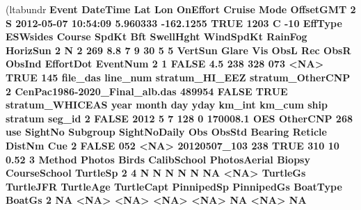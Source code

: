 \documentclass[
]{book}
\newenvironment{Shaded}{\begin{snugshade}}{\end{snugshade}}
\newcommand{\DecValTok}[1]{\textcolor[rgb]{0.00,0.00,0.81}{#1}}
\newcommand{\ErrorTok}[1]{\textcolor[rgb]{0.64,0.00,0.00}{\textbf{#1}}}
\newcommand{\FloatTok}[1]{\textcolor[rgb]{0.00,0.00,0.81}{#1}}
\newcommand{\KeywordTok}[1]{\textcolor[rgb]{0.13,0.29,0.53}{\textbf{#1}}}
\newcommand{\NormalTok}[1]{#1}
\newcommand{\OperatorTok}[1]{\textcolor[rgb]{0.81,0.36,0.00}{\textbf{#1}}}
\newcommand{\OtherTok}[1]{\textcolor[rgb]{0.56,0.35,0.01}{#1}}
\newcommand{\StringTok}[1]{\textcolor[rgb]{0.31,0.60,0.02}{#1}}
\begin{document}
\begin{Shaded}
\begin{Highlighting}[]
\NormalTok{(ltabundr }\OperatorTok{%
\NormalTok{  Event            DateTime      Lat       Lon OnEffort Cruise Mode OffsetGMT}
\DecValTok{2}\NormalTok{     S }\DecValTok{2012-05-07} \DecValTok{10}\OperatorTok{:}\DecValTok{54}\OperatorTok{:}\DecValTok{09} \FloatTok{5.960333} \FloatTok{-162.1255}     \OtherTok{TRUE}   \DecValTok{1203}\NormalTok{    C       }\DecValTok{-10}
\NormalTok{  EffType ESWsides Course SpdKt Bft SwellHght WindSpdKt RainFog HorizSun}
\DecValTok{2}\NormalTok{       N        }\DecValTok{2}    \DecValTok{269}   \FloatTok{8.8}   \DecValTok{7}         \DecValTok{9}        \DecValTok{30}       \DecValTok{5}        \DecValTok{5}
\NormalTok{  VertSun Glare Vis ObsL Rec ObsR ObsInd EffortDot EventNum}
\DecValTok{2}       \DecValTok{1} \OtherTok{FALSE} \FloatTok{4.5}  \DecValTok{238} \DecValTok{328}  \DecValTok{073}   \OperatorTok{<}\OtherTok{NA}\OperatorTok{>}\StringTok{      }\OtherTok{TRUE}      \DecValTok{145}
\NormalTok{                       file_das line_num stratum_HI_EEZ stratum_OtherCNP}
\DecValTok{2}\NormalTok{ CenPac1986}\DecValTok{-2020}\NormalTok{_Final_alb.das   }\DecValTok{489954}          \OtherTok{FALSE}             \OtherTok{TRUE}
\NormalTok{  stratum_WHICEAS year month day yday km_int   km_cum ship  stratum seg_id}
\DecValTok{2}           \OtherTok{FALSE} \DecValTok{2012}     \DecValTok{5}   \DecValTok{7}  \DecValTok{128}      \DecValTok{0} \FloatTok{170008.1}\NormalTok{  OES OtherCNP    }\DecValTok{268}
\NormalTok{    use SightNo Subgroup SightNoDaily Obs ObsStd Bearing Reticle DistNm Cue}
\DecValTok{2} \OtherTok{FALSE}     \DecValTok{052}     \OperatorTok{<}\OtherTok{NA}\OperatorTok{>}\StringTok{ }\DecValTok{20120507}\NormalTok{_}\DecValTok{103} \DecValTok{238}   \OtherTok{TRUE}     \DecValTok{310}      \DecValTok{10}   \FloatTok{0.52}   \DecValTok{3}
\NormalTok{  Method Photos Birds CalibSchool PhotosAerial Biopsy CourseSchool TurtleSp}
\DecValTok{2}      \DecValTok{4}\NormalTok{      N     N           N            N      N           }\OtherTok{NA}     \OperatorTok{<}\OtherTok{NA}\OperatorTok{>}
\StringTok{  }\NormalTok{TurtleGs TurtleJFR TurtleAge TurtleCapt PinnipedSp PinnipedGs BoatType BoatGs}
\DecValTok{2}       \OtherTok{NA}      \OperatorTok{<}\OtherTok{NA}\OperatorTok{>}\StringTok{      }\ErrorTok{<}\OtherTok{NA}\OperatorTok{>}\StringTok{       }\ErrorTok{<}\OtherTok{NA}\OperatorTok{>}\StringTok{       }\ErrorTok{<}\OtherTok{NA}\OperatorTok{>}\StringTok{         }\OtherTok{NA}     \OperatorTok{<}\OtherTok{NA}\OperatorTok{>}\StringTok{     }\OtherTok{NA}
}
\end{Highlighting}
\end{Shaded}
\end{document}
